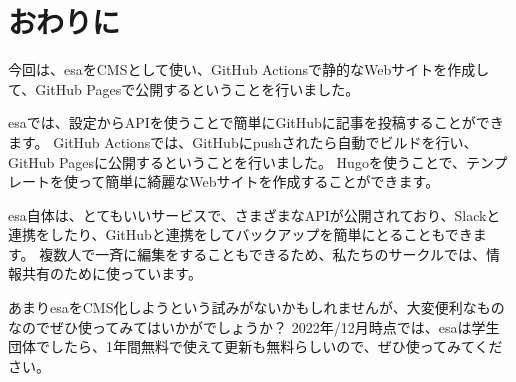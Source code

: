 \chapter{おわりに}

今回は、esaをCMSとして使い、GitHub Actionsで静的なWebサイトを作成して、GitHub Pagesで公開するということを行いました。

esaでは、設定からAPIを使うことで簡単にGitHubに記事を投稿することができます。
GitHub Actionsでは、GitHubにpushされたら自動でビルドを行い、GitHub Pagesに公開するということを行いました。
Hugoを使うことで、テンプレートを使って簡単に綺麗なWebサイトを作成することができます。

esa自体は、とてもいいサービスで、さまざまなAPIが公開されており、Slackと連携をしたり、GitHubと連携をしてバックアップを簡単にとることもできます。
複数人で一斉に編集をすることもできるため、私たちのサークルでは、情報共有のために使っています。

あまりesaをCMS化しようという試みがないかもしれませんが、大変便利なものなのでぜひ使ってみてはいかがでしょうか？
2022年/12月時点では、esaは学生団体でしたら、1年間無料で使えて更新も無料らしいので、ぜひ使ってみてください。

